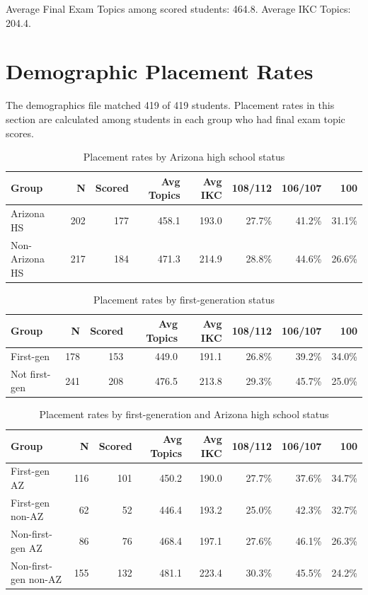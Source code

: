 \documentclass[11pt]{article}
\begin{document}
Average Final Exam Topics among scored students: 464.8. Average IKC Topics: 204.4.

\clearpage

\section*{Demographic Placement Rates}

The demographics file matched 419 of 419 students. Placement rates in this section are calculated among students in each group who had final exam topic scores.

\begin{table}[htbp]
\centering
\small
\caption{Placement rates by Arizona high school status}
\begin{tabular}{lrrrrrrr}
\hline
Group & N & Scored & Avg Topics & Avg IKC & 108/112 & 106/107 & 100 \\
\hline
Arizona HS & 202 & 177 & 458.1 & 193.0 & 27.7\% & 41.2\% & 31.1\% \\
Non-Arizona HS & 217 & 184 & 471.3 & 214.9 & 28.8\% & 44.6\% & 26.6\% \\
\hline
\end{tabular}
\end{table}

\begin{table}[htbp]
\centering
\small
\caption{Placement rates by first-generation status}
\begin{tabular}{lrrrrrrr}
\hline
Group & N & Scored & Avg Topics & Avg IKC & 108/112 & 106/107 & 100 \\
\hline
First-gen & 178 & 153 & 449.0 & 191.1 & 26.8\% & 39.2\% & 34.0\% \\
Not first-gen & 241 & 208 & 476.5 & 213.8 & 29.3\% & 45.7\% & 25.0\% \\
\hline
\end{tabular}
\end{table}

\begin{table}[htbp]
\centering
\small
\caption{Placement rates by first-generation and Arizona high school status}
\begin{tabular}{lrrrrrrr}
\hline
Group & N & Scored & Avg Topics & Avg IKC & 108/112 & 106/107 & 100 \\
\hline
First-gen AZ & 116 & 101 & 450.2 & 190.0 & 27.7\% & 37.6\% & 34.7\% \\
First-gen non-AZ & 62 & 52 & 446.4 & 193.2 & 25.0\% & 42.3\% & 32.7\% \\
Non-first-gen AZ & 86 & 76 & 468.4 & 197.1 & 27.6\% & 46.1\% & 26.3\% \\
Non-first-gen non-AZ & 155 & 132 & 481.1 & 223.4 & 30.3\% & 45.5\% & 24.2\% \\
\hline
\end{tabular}
\end{table}
\end{document}
